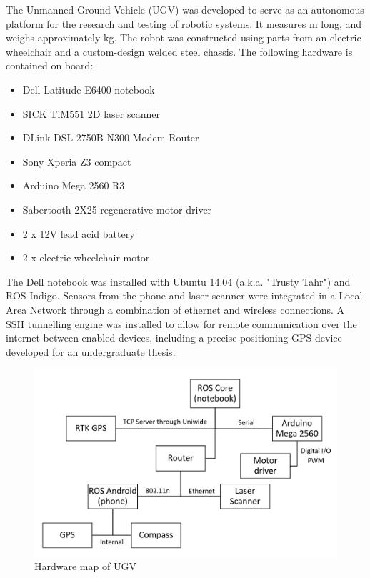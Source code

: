 \documentclass[titlepage,12pt,a4paper]{article}
\begin{document}
The Unmanned Ground Vehicle (UGV) was developed to serve as an autonomous platform for the research and testing of robotic systems. It measures \unit[1]{m} long, and weighs approximately \unit[50]{kg}. The robot was constructed using parts from an electric wheelchair and a custom-design welded steel chassis. The following hardware is contained on board:
\begin{itemize}
	\item Dell Latitude E6400 notebook
	\item SICK TiM551 2D laser scanner
	\item DLink DSL 2750B N300 Modem Router
	\item Sony Xperia Z3 compact
	\item Arduino Mega 2560 R3
	\item Sabertooth 2X25 regenerative motor driver
	\item 2 x 12V lead acid battery
	\item 2 x electric wheelchair motor
\end{itemize}

The Dell notebook was installed with Ubuntu 14.04 (a.k.a. "Trusty Tahr") and ROS Indigo. Sensors from the phone and laser scanner were integrated in a Local Area Network through a combination of ethernet and wireless connections. A SSH tunnelling engine was installed to allow for remote communication over the internet between enabled devices, including a precise positioning GPS device developed for an undergraduate thesis. 

\begin{figure}[h!]
	\centering
	\includegraphics[scale=0.6]{figures/hardware_chart.png}
	\caption{Hardware map of UGV}
	\label{figure:hardware_chart}
\end{figure}
\pagebreak
\end{document}
